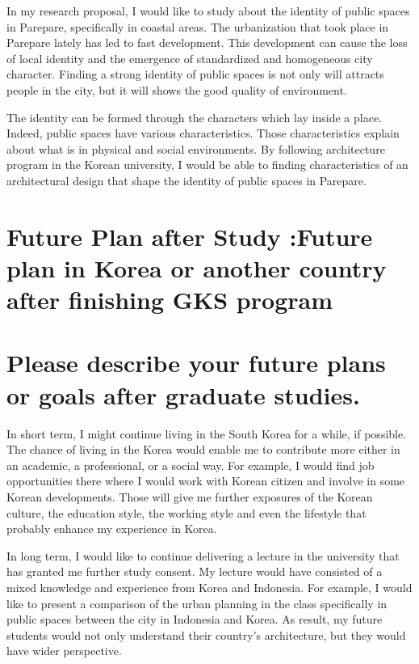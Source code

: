 \documentclass[../main.tex]{subfiles}
\begin{document}
In my research proposal, I would like to study about the identity of public spaces in Parepare, specifically in coastal areas. The urbanization that took place in Parepare lately has led to fast development. This development can cause the loss of local identity and the emergence of standardized and homogeneous city character. Finding a strong identity of public spaces is not only will attracts people in the city, but it will shows the good quality of environment.

The identity can be formed through the characters which lay inside a place. Indeed, public spaces have various characteristics. Those characteristics explain about what is in physical and social environments. By following architecture program in the Korean university, I would be able to finding characteristics of an architectural design that shape the identity of public spaces in Parepare.


\section{Future Plan after Study :Future plan in Korea or another country after finishing GKS program}
\section*{Please describe your future plans or goals after graduate studies.}

In short term, I might continue living in the South Korea for a while, if possible. The chance of living in the Korea would enable me to contribute more either in an academic, a professional, or a social way. For example, I would find job opportunities there where I would work with Korean citizen and involve in some Korean developments. Those will give me further exposures of the Korean culture, the education style, the working style and even the lifestyle that probably enhance my experience in Korea.

In long term, I would like to continue delivering a lecture in the university that has granted me further study consent. My lecture would have consisted of a mixed knowledge and experience from Korea and Indonesia. For example, I would like to present a comparison of the urban planning in the class specifically in public spaces between the city in Indonesia and Korea. As result, my future students would not only understand their country's architecture, but they would have wider perspective.
\end{document}
